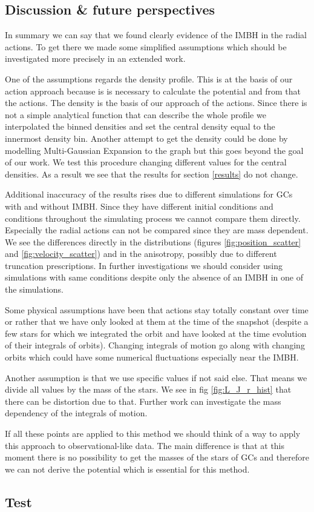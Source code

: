 \subsection{Discussion \& future perspectives}
In summary we can say that we found clearly evidence of the \ac{IMBH} in the radial actions. To get there we made some simplified assumptions which should be investigated more precisely in an extended work. 
\par One of the assumptions regards the density profile. This is at the basis of our action approach because is is necessary to calculate the potential and from that the actions. The density is the basis of our approach of the actions. Since there is not a simple analytical function that can describe the whole profile we interpolated the binned densities and set the central density equal to the innermost density bin. Another attempt to get the density could be done by modelling Multi-Gaussian Expansion to the graph but this goes beyond the goal of our work. We test this procedure changing different values for the central densities. As a result we see that the results for section \ref{results} do not change.
\par Additional inaccuracy of the results rises due to different simulations for \acp{GC} with and without \ac{IMBH}. Since they have different initial conditions and conditions throughout the simulating process we cannot compare them directly. Especially the radial actions can not be compared since they are mass dependent. We see the differences directly in the distributions (figures \ref{fig:position_scatter} and \ref{fig:velocity_scatter}) and in the anisotropy, possibly due to different truncation prescriptions. In further investigations we should consider using simulations with same conditions despite only the absence of an \ac{IMBH} in one of the simulations. 
\par Some physical assumptions have been that actions stay totally constant over time or rather that we have only looked at them at the time of the snapshot (despite a few stars for which we integrated the orbit and have looked at the time evolution of their integrals of orbits). Changing integrals of motion go along with changing orbits which could have some numerical fluctuations especially near the \ac{IMBH}. 
\par Another assumption is that we use specific values if not said else. That means we divide all values by the mass of the stars. We see in fig \ref{fig:L_J_r_hist} that there can be distortion due to that. Further work can investigate the mass dependency of the integrals of motion. 
\par If all these points are applied to this method we should think of a way to apply this approach to observational-like data. The main difference is that at this moment there is no possibility to get the masses of the stars of \acp{GC} and therefore we can not derive the potential which is essential for this method. 

\subsection{Test }





